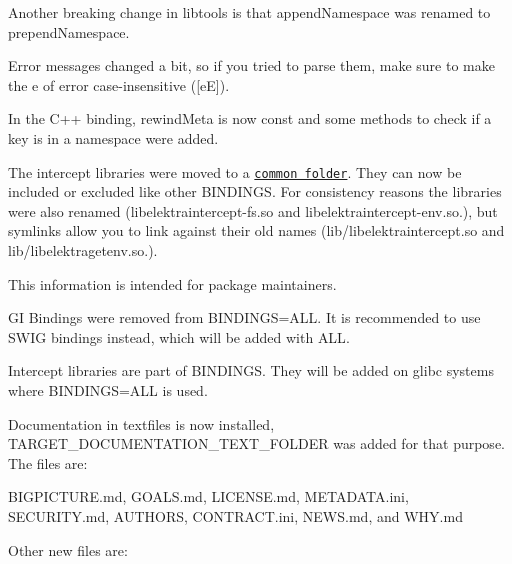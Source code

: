 Another breaking change in {\ttfamily libtools} is that {\ttfamily append\+Namespace} was renamed to {\ttfamily prepend\+Namespace}.

Error messages changed a bit, so if you tried to parse them, make sure to make the {\ttfamily e} of error case-\/insensitive ({\ttfamily \mbox{[}eE\mbox{]}}).

In the C++ binding, {\ttfamily rewind\+Meta} is now {\ttfamily const} and some methods to check if a key is in a namespace were added.

The intercept libraries were moved to a \href{https://master.libelektra.org/src/bindings/intercept}{\tt common folder}. They can now be included or excluded like other {\ttfamily B\+I\+N\+D\+I\+N\+GS}. For consistency reasons the libraries were also renamed ({\ttfamily libelektraintercept-\/fs.\+so} and {\ttfamily libelektraintercept-\/env.\+so.}), but symlinks allow you to link against their old names ({\ttfamily lib/libelektraintercept.\+so} and {\ttfamily lib/libelektragetenv.\+so.}).

This information is intended for package maintainers.


\begin{DoxyItemize}
\item GI Bindings were removed from {\ttfamily B\+I\+N\+D\+I\+N\+GS=A\+LL}. It is recommended to use {\ttfamily S\+W\+IG} bindings instead, which will be added with {\ttfamily A\+LL}.
\item Intercept libraries are part of {\ttfamily B\+I\+N\+D\+I\+N\+GS}. They will be added on glibc systems where {\ttfamily B\+I\+N\+D\+I\+N\+GS=A\+LL} is used.
\item Documentation in textfiles is now installed, {\ttfamily T\+A\+R\+G\+E\+T\+\_\+\+D\+O\+C\+U\+M\+E\+N\+T\+A\+T\+I\+O\+N\+\_\+\+T\+E\+X\+T\+\_\+\+F\+O\+L\+D\+ER} was added for that purpose. The files are\+:
\begin{DoxyItemize}
\item {\ttfamily B\+I\+G\+P\+I\+C\+T\+U\+R\+E.\+md}, {\ttfamily G\+O\+A\+L\+S.\+md}, {\ttfamily L\+I\+C\+E\+N\+S\+E.\+md}, {\ttfamily M\+E\+T\+A\+D\+A\+T\+A.\+ini}, {\ttfamily S\+E\+C\+U\+R\+I\+T\+Y.\+md}, {\ttfamily A\+U\+T\+H\+O\+RS}, {\ttfamily C\+O\+N\+T\+R\+A\+C\+T.\+ini}, {\ttfamily N\+E\+W\+S.\+md}, and {\ttfamily W\+H\+Y.\+md}
\end{DoxyItemize}
\end{DoxyItemize}

Other new files are\+:


